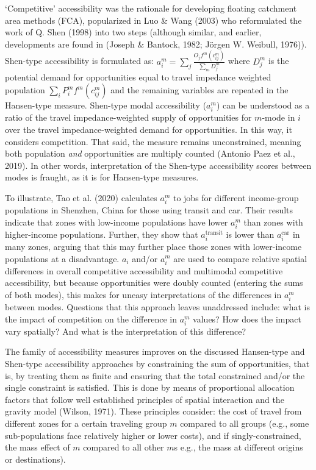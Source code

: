 \documentclass[
11pt, %
oneside, %
english, %
singlespacing, %
]{macthesis} %
\begin{document}
`Competitive' accessibility was the rationale for developing floating catchment area methods (FCA), popularized in Luo \& Wang (2003) who reformulated the work of Q. Shen (1998) into two steps (although similar, and earlier, developments are found in (Joseph \& Bantock, 1982; Jörgen W. Weibull, 1976)). Shen-type accessibility is formulated as: \(a_i^m = \sum_j \frac{O_jf^m(c_{ij}^m)}{\sum_m D_j^m}\) where \(D_j^m\) is the potential demand for opportunities equal to travel impedance weighted population \(\sum_i P_i^m f^m(c_{ij}^m)\) and the remaining variables are repeated in the Hansen-type measure. Shen-type modal accessibility (\(a_i^m\)) can be understood as a ratio of the travel impedance-weighted supply of opportunities for \(m\)-mode in \(i\) over the travel impedance-weighted demand for opportunities. In this way, it considers competition. That said, the measure remains unconstrained, meaning both population \emph{and} opportunities are multiply counted (Antonio Paez et al., 2019). In other words, interpretation of the Shen-type accessibility scores between modes is fraught, as it is for Hansen-type measures.

To illustrate, Tao et al. (2020) calculates \(a_i^m\) to jobs for different income-group populations in Shenzhen, China for those using transit and car. Their results indicate that zones with low-income populations have lower \(a_i^m\) than zones with higher-income populations. Further, they show that \(a_i^{\text{transit}}\) is lower than \(a_i^{\text{car}}\) in many zones, arguing that this may further place those zones with lower-income populations at a disadvantage. \(a_i\) and/or \(a_i^m\) are used to compare relative spatial differences in overall competitive accessibility and multimodal competitive accessibility, but because opportunities were doubly counted (entering the sums of both modes), this makes for uneasy interpretations of the differences in \(a_i^{m}\) between modes. Questions that this approach leaves unaddressed include: what is the impact of competition on the difference in \(a_i^m\) values? How does the impact vary spatially? And what is the interpretation of this difference?

The family of accessibility measures improves on the discussed Hansen-type and Shen-type accessibility approaches by constraining the sum of opportunities, that is, by treating them as finite and ensuring that the total constrained and/or the single constraint is satisfied. This is done by means of proportional allocation factors that follow well established principles of spatial interaction and the gravity model (Wilson, 1971). These principles consider: the cost of travel from different zones for a certain traveling group \(m\) compared to all groups (e.g., some sub-populations face relatively higher or lower costs), and if singly-constrained, the mass effect of \(m\) compared to all other \(m\)s e.g., the mass at different origins or destinations).
\end{document}

